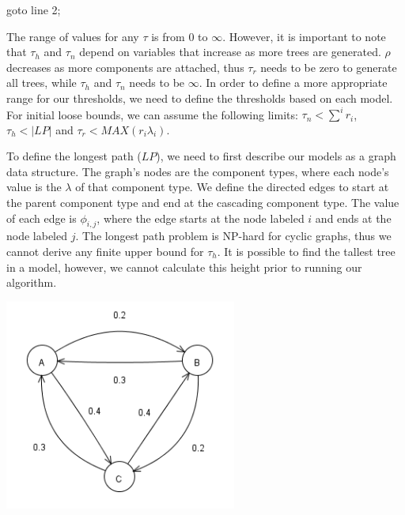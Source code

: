 \documentclass[12pt]{article}
\begin{document}
\begin{algorithmic}
		\STATE goto line 2;
	\ENDIF
\end{algorithmic}

\vspace{1em}
The range of values for any $\tau$ is from 0 to $\infty$. However, it is important to note that $\tau_h$ and $\tau_n$ depend on variables that increase as more trees are generated.  $\rho$ decreases as more components are attached, thus $\tau_r$ needs to be zero to generate all trees, while $\tau_h$ and $\tau_n$ needs to be $\infty$.  In order to define a more appropriate range for our thresholds, we need to define the thresholds based on each model.   For initial loose bounds, we can assume the following limits: $\tau_n < \displaystyle\sum^i r_i$, $\tau_h < |LP|$ and $\tau_r < MAX(r_i \lambda_i)$.

To define the longest path ($LP$), we need to first describe our models as a graph data structure.  The graph's nodes are the component types, where each node's value is the $\lambda$ of that component type.  We define the directed edges to start at the parent component type and end at the cascading component type.  The value of each edge is $\phi_{i, j}$, where the edge starts at the node labeled $i$ and ends at the node labeled $j$.  The longest path problem is NP-hard for cyclic graphs, thus we cannot derive any finite upper bound for $\tau_h$.  It is possible to find the tallest tree in a model, however, we cannot calculate this height prior to running our algorithm.

\begin{minipage}[c]{\textwidth}
	\centering
	\includegraphics[width=3.0in]{simulation125model.png}
	\label{fig:model}
\end{minipage}
\end{document}
